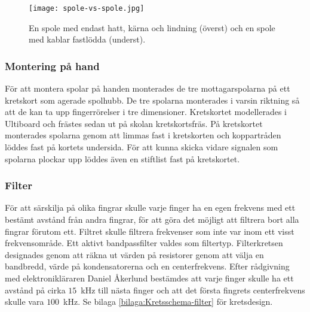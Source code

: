 \documentclass[a4paper]{article}
\begin{document}
\begin{sloppypar}
    \begin{figure}[H]
        \centering
        \texttt{[image: spole-vs-spole.jpg]}
        \caption{En spole med endast hatt, kärna och lindning (överst) och en spole med kablar fastlödda (underst).}
        \label{fig:SpoleVsSpole}
    \end{figure}


    \subsubsection{Montering på hand} %
    För att montera spolar på handen monterades de tre mottagarspolarna på ett kretskort som agerade spolhubb.
    De tre spolarna monterades i varsin riktning så att de kan ta upp fingerrörelser i tre dimensioner.
    Kretskortet modellerades i Ultiboard och frästes sedan ut på skolan kretskortsfräs.
    På kretskortet monterades spolarna genom att limmas fast i kretskorten och koppartråden löddes fast på kortets undersida.
    För att kunna skicka vidare signalen som spolarna plockar upp löddes även en stiftlist fast på kretskortet.


    \subsubsection{Filter}
    För att särskilja på olika fingrar skulle varje finger ha en egen frekvens med ett bestämt avstånd från andra fingrar, för att göra det möjligt att filtrera bort alla fingrar förutom ett.
    Filtret skulle filtrera frekvenser som inte var inom ett visst frekvensområde.
    Ett aktivt bandpassfilter valdes som filtertyp.
    Filterkretsen designades genom att räkna ut värden på resistorer genom att välja en bandbredd, värde på kondensatorerna och en centerfrekvens.
    Efter rådgivning med elektronikläraren Daniel Åkerlund bestämdes att varje finger skulle ha ett avstånd på cirka $15$~kHz till nästa finger och att det första fingrets centerfrekvens skulle vara $100$~kHz.
    Se bilaga \ref{bilaga:Kretsschema-filter} för kretsdesign.


\end{sloppypar}
\end{document}
